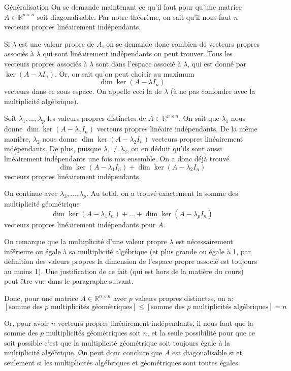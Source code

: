 \documentclass[a4paper]{article}
\begin{document}
\begin{parag}{Généralisation}
    On se demande maintenant ce qu'il faut pour qu'une matrice $A \in \mathbb{R}^{n \times n}$ soit diagonalisable. Par notre théorème, on sait qu'il nous faut $n$ vecteurs propres linéairement indépendants.

    Si $\lambda$ est une valeur propre de $A$, on se demande donc combien de vecteurs propres associés à $\lambda$ qui sont linéairement indépendants on peut trouver. Tous les vecteurs propres associés à $\lambda$ sont dans l'espace associé à $\lambda$, qui est donné par $\ker\left(A - \lambda I_n\right)$. Or, on sait qu'on peut choisir au maximum 
    \[\dim\ker\left(A - \lambda I_n\right)\]
    vecteurs dans ce sous espace. On appelle ceci la  de $\lambda$ (à ne pas confondre avec la multiplicité algébrique).

    Soit $\lambda_1, \ldots, \lambda_p$ les valeurs propres distinctes de $A \in \mathbb{R}^{n \times n}$. On sait que $\lambda_1$ nous donne $\dim\ker\left(A - \lambda_1 I_n\right)$ vecteurs propres linéaire indépendants. De la même manière, $\lambda_2$ nous donne $\dim\ker\left(A - \lambda_2 I_n\right)$ vecteurs propres linéairement indépendants. De plus, puisque $\lambda_1 \neq \lambda_2$, on en déduit qu'ils sont aussi linéairement indépendants une fois mis ensemble. On a donc déjà trouvé 
    \[\dim\ker\left(A - \lambda_1 I_n\right) + \dim\ker\left(A - \lambda_2 I_n\right)\]
    vecteurs propres linéairement indépendants.

    On continue avec $\lambda_3, \ldots, \lambda_p$. Au total, on a trouvé exactement la somme des multiplicité géométrique
    \[\dim\ker\left(A - \lambda_1 I_n\right) + \ldots + \dim\ker\left(A - \lambda_p I_{n}\right)\]
    vecteurs propres linéairement indépendants pour $A$.

    On remarque que la multiplicité d'une valeur propre $\lambda$ est nécessairement inférieure ou égale à sa multiplicité algébrique (et plus grande ou égale à 1, par définition des valeurs propres la dimension de l'espace propre associé est toujours au moins 1). Une justification de ce fait (qui est hors de la matière du cours) peut être vue dans le paragraphe suivant.

     Donc, pour une matrice $A \in \mathbb{R}^{n \times n}$ avec $p$ valeurs propres distinctes, on a: 
    \[\left[\text{somme des $p$ multiplicités géométriques}\right] \leq \left[\text{somme des $p$ multiplicités algébriques}\right] = n\]

    Or, pour avoir $n$ vecteurs propres linéairement indépendants, il nous faut que la somme des $p$ multiplicités géométriques soit $n$, et la seule possibilité pour que ce soit possible c'est que la multiplicité géométrique soit toujours égale à la multiplicité algébrique. On peut donc conclure que $A$ est diagonalisable si et seulement si les multiplicités algébriques et géométriques sont toutes égales.
        
\end{parag}
\end{document}
